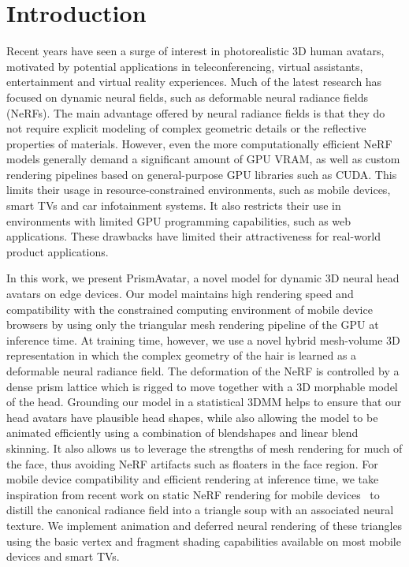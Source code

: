 \section{Introduction}

Recent years have seen a surge of interest in photorealistic 3D human avatars, motivated by potential applications in teleconferencing, virtual assistants, entertainment and virtual reality experiences. Much of the latest research has focused on dynamic neural fields, such as deformable neural radiance fields (NeRFs). The main advantage offered by neural radiance fields is that they do not require explicit modeling of complex geometric details or the reflective properties of materials. However, even the more computationally efficient NeRF models generally demand a significant amount of GPU VRAM, as well as custom rendering pipelines based on general-purpose GPU libraries such as CUDA. This limits their usage in resource-constrained environments, such as mobile devices, smart TVs and car infotainment systems. It also restricts their use in environments with limited GPU programming capabilities, such as web applications. These drawbacks have limited their attractiveness for real-world product applications.

In this work, we present PrismAvatar, a novel model for dynamic 3D neural head avatars on edge devices. Our model maintains high rendering speed and compatibility with the constrained computing environment of mobile device browsers by using only the triangular mesh rendering pipeline of the GPU at inference time. At training time, however, we use a novel hybrid mesh-volume 3D representation in which the complex geometry of the hair is learned as a deformable neural radiance field. The deformation of the NeRF is controlled by a dense prism lattice which is rigged to move together with a 3D morphable model of the head. Grounding our model in a statistical 3DMM helps to ensure that our head avatars have plausible head shapes, while also allowing the model to be animated efficiently using a combination of blendshapes and linear blend skinning. It also allows us to leverage the strengths of mesh rendering for much of the face, thus avoiding NeRF artifacts such as floaters in the face region. For mobile device compatibility and efficient rendering at inference time, we take inspiration from recent work on static NeRF rendering for mobile devices~\cite{chen2023mobilenerf} to distill the canonical radiance field into a triangle soup with an associated neural texture. We implement animation and deferred neural rendering of these triangles using the basic vertex and fragment shading capabilities available on most  mobile devices and smart TVs.

